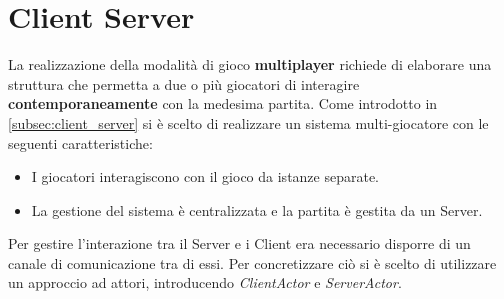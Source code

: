 \section{Client Server}
\label{sec:client_server_design}
La realizzazione della modalità di gioco \textbf{multiplayer} richiede di elaborare una struttura che permetta a due o più giocatori di interagire \textbf{contemporaneamente} con la medesima partita. Come introdotto in \ref{subsec:client_server} si è scelto di realizzare un sistema multi-giocatore con le seguenti caratteristiche:
\begin{itemize}
    \item I giocatori interagiscono con il gioco da istanze separate.
    \item La gestione del sistema è centralizzata e la partita è gestita da un Server.
\end{itemize}

Per gestire l'interazione tra il Server e i Client era necessario disporre di un canale di comunicazione tra di essi. Per concretizzare ciò si è scelto di utilizzare un approccio ad attori, introducendo \textit{ClientActor} e \textit{ServerActor}. 

